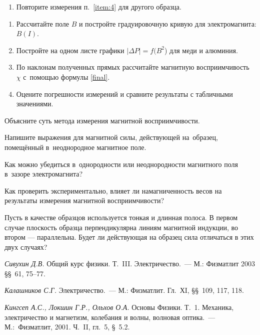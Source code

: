 \begin{lab:task}
\begin{enumerate}
\item Повторите измерения п.~\ref{item:4} для другого образца.

\end{enumerate}


\begin{enumerate}
	\item Рассчитайте поле $B$ и постройте градуировочную кривую для
электромагнита: $B(I)$.
	\item Постройте на одном листе графики $|\Delta P|=f(B^2$) для меди и
алюминия.
	\item По наклонам полученных прямых рассчитайте магнитную восприимчивость~$\chi$
    с~помощью формулы \eqref{final}.
	\item Оцените погрешности измерений и сравните результаты с табличными
значениями.
\end{enumerate}

\end{lab:task}


\begin{lab:questions}
	\item Объясните суть метода измерения магнитной восприимчивости.
	\item Напишите выражения для магнитной силы, действующей на~образец,
помещённый в~неоднородное магнитное поле.
	\item Как можно убедиться в~однородности или неоднородности магнитного поля
в~зазоре электромагнита?
	\item Как проверить экспериментально, влияет ли намагниченность весов на
результаты измерения магнитной восприимчивости?
	\item Пусть в качестве образцов используется тонкая и длинная полоса.
    В первом случае плоскость образца перпендикулярна линиям магнитной индукции,
    во втором --- параллельна. Будет ли действующая на образец сила
    отличаться в этих двух случаях?
\end{lab:questions}


\begin{lab:literature}
	\item \emph{Сивухин Д.В.} Общий курс физики. Т.~III. Электричество.~--- М.:
Физматлит 2003 \S\S~61, 75--77.
	\item \emph {Калашников С.Г.} Электричество.~--- М.: Физматлит. Гл.~ХI,
\S\S~109, 117, 118.
	\item \emph{Кингсеп А.С., Локшин Г.Р., Ольхов О.А.} Основы Физики. Т.~1.
Механика, электричество и магнетизм, колебания и волны, волновая оптика.~---
М.:~Физматлит, 2001. Ч.~II, гл.~5, \S~5.2.
\end{lab:literature}

